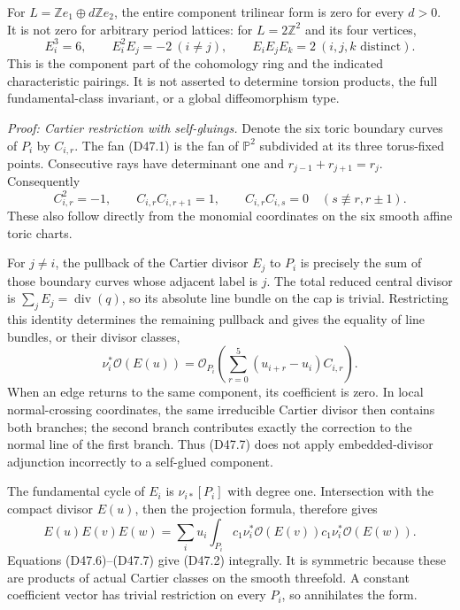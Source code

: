 For $L=\mathbb Ze_1\oplus d\mathbb Ze_2$, the entire
component trilinear form is zero for every $d>0$.
It is not zero for arbitrary period lattices: for
$L=2\mathbb Z^2$ and its four vertices,
\[
 E_i^3=6,\qquad E_i^2E_j=-2\ (i\ne j),\qquad
 E_iE_jE_k=2\ (i,j,k\text{ distinct}).                      \tag{D47.5}
\]
This is the component part of the cohomology ring and
the indicated characteristic pairings. It is not asserted
to determine torsion products, the full fundamental-class
invariant, or a global diffeomorphism type.

\emph{Proof: Cartier restriction with self-gluings.}
Denote the six toric boundary curves of $P_i$ by $C_{i,r}$.
The fan (D47.1) is the fan of $\mathbb P^2$ subdivided
at its three torus-fixed points. Consecutive rays have
determinant one and $r_{j-1}+r_{j+1}=r_j$. Consequently
\[
 C_{i,r}^2=-1,\qquad
 C_{i,r}C_{i,r+1}=1,\qquad
 C_{i,r}C_{i,s}=0\quad(s\not\equiv r,r\pm1).               \tag{D47.6}
\]
These also follow directly from the monomial coordinates
on the six smooth affine toric charts.

For $j\ne i$, the pullback of the Cartier divisor $E_j$
to $P_i$ is precisely the sum of those boundary curves
whose adjacent label is $j$. The total reduced central
divisor is $\sum_jE_j=\operatorname{div}(q)$, so its
absolute line bundle on the cap is trivial. Restricting
this identity determines the remaining pullback and gives
the equality of line bundles, or their divisor classes,
\[
 \nu_i^*\mathcal O(E(u))
       =\mathcal O_{P_i}\left(
                   \sum_{r=0}^5(u_{i+r}-u_i)C_{i,r}\right).
                                                               \tag{D47.7}
\]
When an edge returns to the same component, its coefficient
is zero. In local normal-crossing coordinates, the same
irreducible Cartier divisor then contains both branches;
the second branch contributes exactly the correction to
the normal line of the first branch. Thus (D47.7) does
not apply embedded-divisor adjunction incorrectly to a
self-glued component.

The fundamental cycle of $E_i$ is $\nu_{i*}[P_i]$ with
degree one. Intersection with the compact divisor $E(u)$,
then the projection formula, therefore gives
\[
 E(u)E(v)E(w)=\sum_i u_i
           \int_{P_i}c_1\nu_i^*\mathcal O(E(v))
                       c_1\nu_i^*\mathcal O(E(w)).          \tag{D47.8}
\]
Equations (D47.6)--(D47.7) give (D47.2) integrally.
It is symmetric because these are products of actual
Cartier classes on the smooth threefold. A constant
coefficient vector has trivial restriction on every
$P_i$, so annihilates the form.

